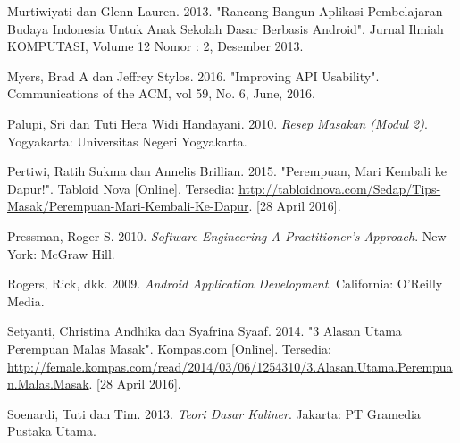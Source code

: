 \documentclass{jtetiskripsi}
\begin{document}
\begin{thebibliography}{99}
	 Murtiwiyati dan Glenn Lauren. 2013. "Rancang Bangun Aplikasi Pembelajaran Budaya Indonesia Untuk Anak Sekolah Dasar Berbasis Android". Jurnal Ilmiah KOMPUTASI, Volume 12 Nomor : 2, Desember 2013.	

	 Myers, Brad A dan Jeffrey Stylos. 2016. "Improving API Usability". Communications of the ACM, vol 59, No. 6, June, 2016.		
	
	Palupi, Sri dan Tuti Hera Widi Handayani. 2010. \textit{Resep Masakan (Modul 2)}. Yogyakarta: Universitas Negeri Yogyakarta.	
	
	 Pertiwi, Ratih Sukma dan Annelis Brillian.  2015. "Perempuan, Mari Kembali ke Dapur!".  Tabloid Nova [Online]. Tersedia: \url{http://tabloidnova.com/Sedap/Tips-Masak/Perempuan-Mari-Kembali-Ke-Dapur}. [28 April 2016].	
	
	Pressman, Roger S. 2010. \textit{Software Engineering A Practitioner's Approach}. New York: McGraw Hill.	
		
	Rogers, Rick, dkk. 2009. \textit{Android Application Development}. California: O'Reilly Media.	
	
	 Setyanti, Christina Andhika dan Syafrina Syaaf.  2014. "3 Alasan Utama Perempuan Malas Masak".  Kompas.com [Online]. Tersedia: \url{http://female.kompas.com/read/2014/03/06/1254310/3.Alasan.Utama.Perempuan.Malas.Masak}. [28 April 2016].
	
	Soenardi, Tuti dan Tim. 2013. \textit{Teori Dasar Kuliner}. Jakarta: PT Gramedia Pustaka Utama.	
		
	
\end{thebibliography}




\end{document}
